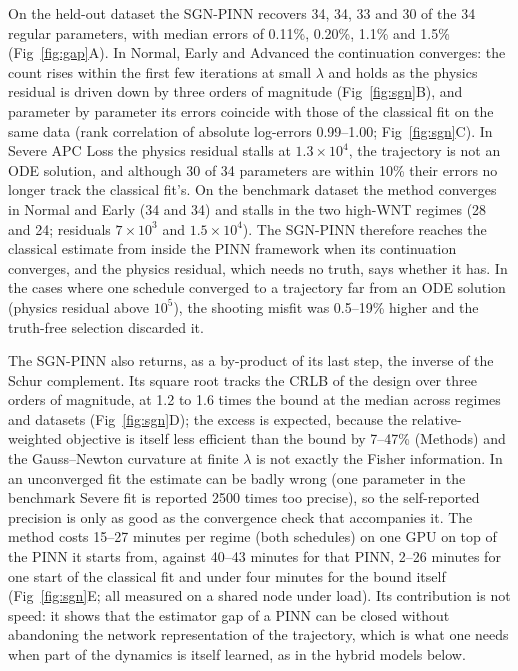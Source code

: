 On the held-out dataset the SGN-PINN recovers 34, 34, 33 and 30 of the 34
regular parameters, with median errors of 0.11\%, 0.20\%, 1.1\% and 1.5\%
(Fig~\ref{fig:gap}A). In Normal, Early and Advanced the continuation converges:
the count rises within the first few iterations at small $\lambda$ and holds as
the physics residual is driven down by three orders of magnitude
(Fig~\ref{fig:sgn}B), and parameter by parameter its errors coincide with those
of the classical fit on the same data (rank correlation of absolute log-errors 0.99--1.00;
Fig~\ref{fig:sgn}C). In Severe APC Loss the physics residual stalls at
$1.3\times10^4$, the trajectory is not an ODE solution, and although 30 of 34
parameters are within 10\% their errors no longer track the classical fit's.
On the benchmark dataset the method converges in Normal and Early (34 and 34)
and stalls in the two high-WNT regimes (28 and 24; residuals $7\times10^3$ and
$1.5\times10^4$). The SGN-PINN therefore reaches the classical estimate from
inside the PINN framework when its continuation converges, and the physics
residual, which needs no truth, says whether it has. In the cases where one
schedule converged to a trajectory far from an ODE solution (physics residual
above $10^5$), the shooting misfit was 0.5--19\% higher and the truth-free
selection discarded it.

The SGN-PINN also returns, as a by-product of its last step, the inverse of the
Schur complement. Its square root tracks the CRLB of the design over three
orders of magnitude, at 1.2 to 1.6 times the bound at the median across regimes
and datasets (Fig~\ref{fig:sgn}D); the excess is expected, because the
relative-weighted objective is itself less efficient than the bound by 7--47\%
(Methods) and the Gauss--Newton curvature at finite $\lambda$ is not exactly the
Fisher information. In an unconverged fit the estimate can be badly wrong (one
parameter in the benchmark Severe fit is reported 2500 times too precise), so
the self-reported precision is only as good as the convergence check that
accompanies it. The method costs 15--27 minutes per regime (both schedules) on one GPU on top
of the PINN it starts from, against 40--43 minutes for that PINN, 2--26 minutes
for one start of the classical fit and under four minutes for the bound itself
(Fig~\ref{fig:sgn}E; all measured on a shared node under load). Its contribution is not speed: it shows that the
estimator gap of a PINN can be closed without abandoning the network
representation of the trajectory, which is what one needs when part of the
dynamics is itself learned, as in the hybrid models below.

